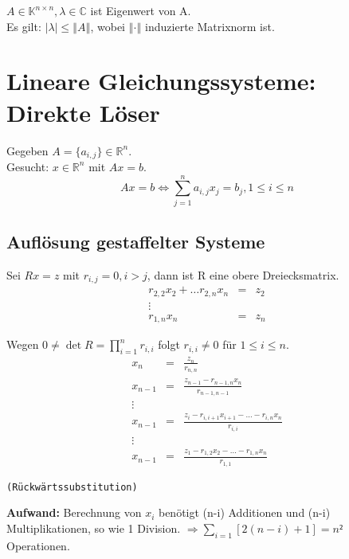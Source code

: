 \documentclass[a4paper,10pt]{article}
\newcommand{\norm}[1]{ \left\Vert #1 \right\Vert }
\newtheorem[L]{satz}{Satz}[section]
\newtheorem[S]{beweis}{Beweis}
\newtheorem[S]{beh}{Behauptung}
\begin{document}
$A \in \mathbb{K}^{n \times n}, \lambda \in \mathbb{C}$ ist Eigenwert von A.\\
Es gilt: $ | \lambda | \leq \norm{A}$, wobei $\norm{\cdot}$ induzierte Matrixnorm ist.
\newpage

\section{Lineare Gleichungssysteme: Direkte Löser}
Gegeben $A = \{a_{i,j}\} \in \mathbb{R}^n$.\\
Gesucht: $x \in \mathbb{R}^n$ mit $Ax = b$.
\begin{equation} \label{eq:lgs}
 Ax = b \Leftrightarrow \sum\limits_{j = 1}^n a_{i,j}x_j = b_j, 1 \leq i\leq n 
\end{equation}


\subsection{Auflösung gestaffelter Systeme}
Sei $Rx = z$ mit $r_{i,j} = 0, i > j$, dann ist R eine obere Dreiecksmatrix.\\

\smallskip
 \begin{eqnarray*} %
  r_{2,2}x_2+ \ldots r_{2,n}x_n &=& z_2\\
  \vdots\\
  r_{1,n}x_n &=& z_n
 \end{eqnarray*}

Wegen $0 \neq \det{R} = \prod \limits_{i = 1}^n r_{i,i} $ folgt $ r_{i,i} \neq 0$ für $ 1 \leq i \leq n$.
\begin{eqnarray*}
  x_n &=& \frac{z_n}{r_{n,n}}\\
  x_{n-1} &=& \frac{  z_{n-1} - r_{n-1, n} x_n  }{  r_{n-1,n-1}  }\\
  \vdots\\
  x_{n-1} &=& \frac{z_{i} - r_{i, i+1} x_{i+1} - \ldots - r_{i, n} x_n}{r_{i,i}}\\
  \vdots\\
  x_{n-1} &=& \frac{z_{1} - r_{1, 2} x_{2} - \ldots - r_{1, n} x_n}{r_{1,1}}
\end{eqnarray*}

\texttt{(Rückwärtssubstitution)}\\

\smallskip

\textbf{Aufwand:} Berechnung von $x_i$ benötigt (n-i) Additionen und (n-i) Multiplikationen, so wie 1 Division.
$\Rightarrow \sum\limits_{i=1} {[2(n-i)+1 ]} = n²$ Operationen.\\
\end{document}
